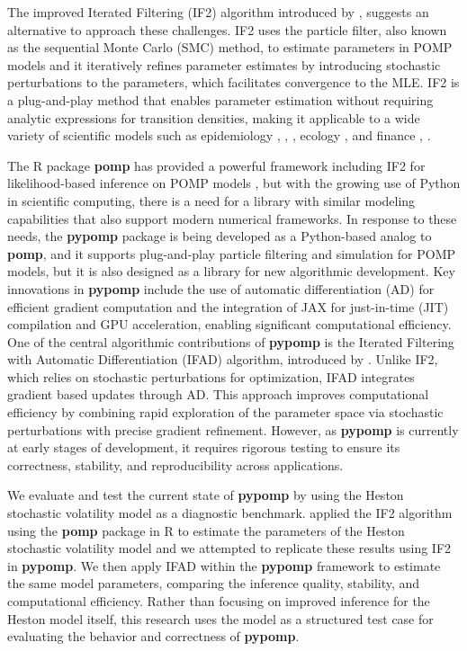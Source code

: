 \documentclass[11pt]{report}
\begin{document}
The improved Iterated Filtering (IF2) algorithm introduced by \citet{ionides2015inference}, suggests an alternative to approach these challenges. IF2 uses the particle filter, also known as the sequential Monte Carlo (SMC) method, to estimate parameters in POMP models and it iteratively refines parameter estimates by introducing stochastic perturbations to the parameters, which facilitates convergence to the MLE. IF2 is a plug-and-play method that enables parameter estimation without requiring analytic expressions for transition densities, making it applicable to a wide variety of scientific models such as epidemiology 
\citep{subramanian2021quantifying}, \citep{wheeler2024informing}, \citep{king2008inapparent}, ecology \citep{li2024inference}, and finance \citep{szczepocki2020application}, \citep{sunmodel}.


The R package \textbf{pomp} has provided a powerful framework including IF2 for likelihood-based inference on POMP models \citep{king2016statistical}, but with the growing use of Python in scientific computing, there is a need for a library with similar modeling capabilities that also support modern numerical frameworks. In response to these needs, the \textbf{pypomp} package is being developed as a Python-based analog to \textbf{pomp}, and it supports plug-and-play particle filtering and simulation for POMP models, but it is also designed as a library for new algorithmic development. Key innovations in \textbf{pypomp} include the use of automatic differentiation (AD) for efficient gradient computation and the integration of JAX for just-in-time (JIT) compilation and GPU acceleration, enabling significant computational efficiency. One of the central algorithmic contributions of \textbf{pypomp} is the Iterated Filtering with Automatic Differentiation (IFAD) algorithm, introduced by \citet{tan2024accelerated}. Unlike IF2, which relies on stochastic perturbations for optimization, IFAD integrates gradient based updates through AD. This approach improves computational efficiency by combining rapid exploration of the parameter space via stochastic perturbations with precise gradient refinement. However, as \textbf{pypomp} is currently at early stages of development, it requires rigorous testing to ensure its correctness, stability, and reproducibility across applications.


We evaluate and test the current state of \textbf{pypomp} by using the Heston stochastic volatility model as a diagnostic benchmark. \citet{sunmodel} applied the IF2 algorithm using the \textbf{pomp} package in R to estimate the parameters of the Heston stochastic volatility model and we attempted to replicate these results using IF2 in \textbf{pypomp}. We then apply IFAD within the \textbf{pypomp} framework to estimate the same model parameters, comparing the inference quality, stability, and computational efficiency. Rather than focusing on improved inference for the Heston model itself, this research uses the model as a structured test case for evaluating the behavior and correctness of \textbf{pypomp}. 
\end{document}
